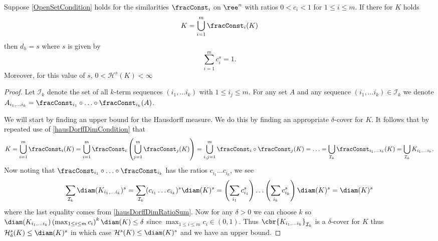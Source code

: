 \begin{theorem}
	Suppose \cref{OpenSetCondition} holds for the similarities $\fracConst_i$ on $\ree^{n}$ with ratios $0 < c_i < 1$ for $1 \leq i \leq m$. If there for $K$ holds
	\begin{equation}\label{hausDorffDimCondition}
		K = \bigcup_{i = 1}^{m} \fracConst_i(K)
	\end{equation}
	then $d_h = s$ where $s$ is given by
	\begin{equation}\label{hausDorffDimRatioSum}
		\sum_{i = 1}^{m} c_i^{s} = 1.
	\end{equation}
	Moreover, for this value of $s$, $0 < \mathcal{H}^s(K) < \infty$
\end{theorem}

\begin{proof}
	Let $\mathcal{I}_k$ denote the set of all $k$-term sequences $(i_1, \ldots i_k)$ with $1 \leq i_j \leq m$. For any set $A$ and any sequence $(i_1, \ldots i_k)\in \mathcal{I}_k$ we denote $A_{i_1, \ldots i_k} = \fracConst_{i_1} \circ \ldots \circ \fracConst_{i_k}(A)$.
	
	We will start by finding an upper bound for the Hausdorff measure. We do this by finding an appropriate $\delta$-cover for $K$. It follows that by repeated use of \eqref{hausDorffDimCondition} that
	\begin{align}
		K = \bigcup_{i = 1}^{m} \fracConst_i(K) =\bigcup_{i = 1}^{m} \fracConst_i \left(\bigcup_{j = 1}^{m} \fracConst_j(K) \right) = \bigcup_{i, j =1}^{m} \fracConst_i \circ \fracConst_j (K) = \ldots =  \bigcup_{\mathcal{I}_k} \fracConst_{i_1, \ldots i_k}(K) =    \bigcup_{\mathcal{I}_k} K_{i_1, \ldots i_k}.
	\end{align}
	Now noting that $\fracConst_{i_1} \circ \ldots \circ \fracConst_{i_k}$ has the ratios $c_{i_1} \dots c_{i_k}$, we see
	\begin{equation}
		\sum_{\mathcal{I}_k} \diam(K_{i_1, \ldots i_k})^{s} = \sum_{\mathcal{I}_k} (c_{i_1} \dots c_{i_k})^{s} \diam(K)^{s} = \left(\sum_{i_1} c_{i_1}^{s}\right) \dots \left(\sum_{i_k}c_{i_k}^{s}\right) \diam(K)^{s} = \diam(K)^{s}
	\end{equation}
	where the last equality comes from \eqref{hausDorffDimRatioSum}. Now for any $\delta > 0$ we can choose $k$ so \newline $\diam(K_{i_1, \ldots i_k}) \left(\max_{1 \leq i \leq m} c_i\right)^{k}\diam(K) \leq \delta$ since $\max_{1 \leq i \leq m} c_i \in (0,1)$. Thus $\cbr{K_{i_1, \ldots i_k}}_{\mathcal{I}_k}$ is a $\delta$-cover for $K$ thus $\mathcal{H}_{\delta}^{s}(K) \leq \diam(K)^{s}$ in which case $\mathcal{H}^{s}(K) \leq \diam(K)^{s}$ and we have an upper bound.
	

\end{proof}

